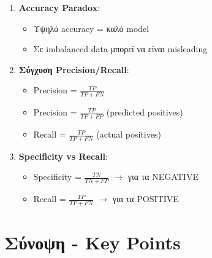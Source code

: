 \begin{warningbox}
\begin{enumerate}
    \item \textbf{Accuracy Paradox}:
    \begin{itemize}
        \item[$\times$] Υψηλό accuracy = καλό model
        \item[\checkmark] Σε imbalanced data μπορεί να είναι misleading
    \end{itemize}

    \item \textbf{Σύγχυση Precision/Recall}:
    \begin{itemize}
        \item[$\times$] Precision = $\frac{TP}{TP + FN}$
        \item[\checkmark] Precision = $\frac{TP}{TP + FP}$ (predicted positives)
        \item[\checkmark] Recall = $\frac{TP}{TP + FN}$ (actual positives)
    \end{itemize}

    \item \textbf{Specificity vs Recall}:
    \begin{itemize}
        \item Specificity = $\frac{TN}{TN + FP}$ $\rightarrow$ για τα NEGATIVE
        \item Recall = $\frac{TP}{TP + FN}$ $\rightarrow$ για τα POSITIVE
    \end{itemize}
\end{enumerate}
\end{warningbox}

\section{Σύνοψη - Key Points}

